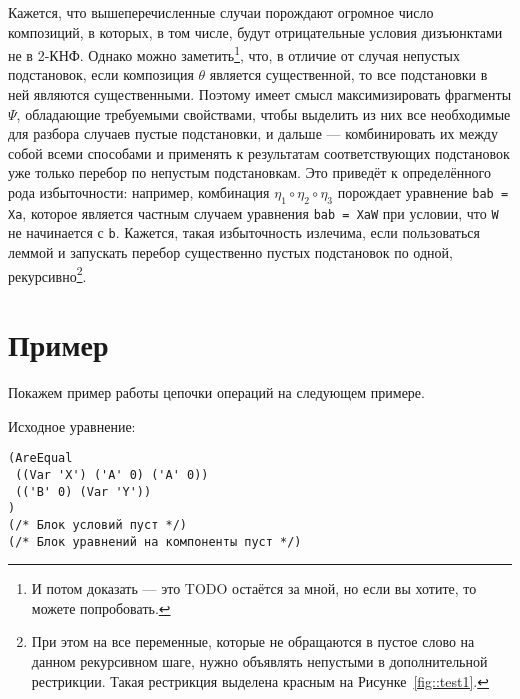\documentclass[12pt]{article}
\begin{document}
Кажется, что вышеперечисленные случаи порождают огромное число композиций, в которых, в том числе, будут отрицательные условия дизъюнктами не в 2-КНФ. Однако можно заметить\footnote{И потом доказать --- это TODO остаётся за мной, но если вы хотите, то можете попробовать.}, что, в отличие от случая непустых подстановок, если композиция $\theta$ является существенной, то все подстановки в ней являются существенными. Поэтому имеет смысл максимизировать фрагменты $\Psi$, обладающие требуемыми свойствами, чтобы выделить из них все необходимые для разбора случаев пустые подстановки, и дальше --- комбинировать их между собой всеми способами и применять к результатам соответствующих подстановок уже только перебор по непустым подстановкам. Это приведёт к определённого рода избыточности: например, комбинация $\eta_1\circ\eta_2\circ\eta_3$ порождает уравнение \verb|bab = Xa|, которое является частным случаем уравнения \verb|bab = XaW|  при условии, что \verb|W| не начинается с \verb|b|. Кажется, такая избыточность излечима, если пользоваться леммой и запускать перебор существенно пустых подстановок по одной, рекурсивно\footnote{При этом на все переменные, которые не обращаются в пустое слово на данном рекурсивном шаге, нужно объявлять непустыми в дополнительной рестрикции. Такая рестрикция выделена красным на Рисунке~\ref{fig::test1}.}.
 
\section{Пример}

Покажем пример работы цепочки операций на следующем примере.

Исходное уравнение: 

\begin{verbatim}
(AreEqual 
 ((Var 'X') ('A' 0) ('A' 0)) 
 (('B' 0) (Var 'Y'))
)
(/* Блок условий пуст */)
(/* Блок уравнений на компоненты пуст */)
\end{verbatim}
\end{document}
